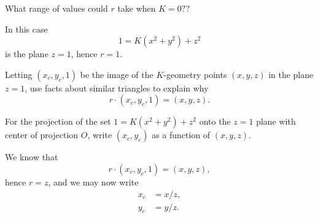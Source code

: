 \documentclass{ximera}
\begin{document}
\begin{problem}
  What range of values could $r$ take when $K=0?$?
  \begin{freeResponse}
    In this case
    \[
    1=K\left(x^{2}+y^{2}\right)+z^{2} 
    \]
    is the plane $z = 1$, hence $r=1$.
  \end{freeResponse}
\end{problem}

\begin{problem}
  Letting $(x_c,y_c,1)$ be the image of the $K$-geometry points
  $(x,y,z)$ in the plane $z=1$, use facts about similar triangles to
  explain why
  \[
  r\cdot(x_{c},y_{c},1)=(x,y,z).
  \]
\end{problem}


\begin{problem}
  For the projection of the set $1=K\left(x^{2}+y^{2}\right)+z^{2}$
  onto the $z=1$ plane with center of projection $O$, write
  $(x_{c},y_{c})$ as a function of $(x,y,z)$.
  \begin{freeResponse}
    We know that
    \[
    r\cdot(x_{c},y_{c},1)=(x,y,z),
    \]
    hence $r=z$, and we may now write
    \begin{align*}
      x_{c} &=x/z,\\
      y_{c} &=y/z.
    \end{align*}
  \end{freeResponse}
\end{problem}
\end{document}
